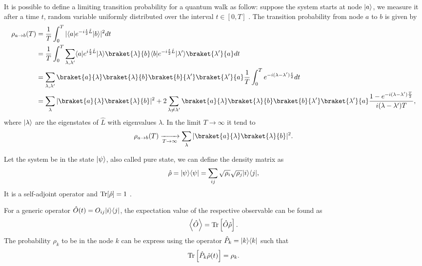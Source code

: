 It is possible to define a limiting transition probability for a quantum walk as follow: suppose the system starts at node $\lvert a\rangle$, we measure it after a time $t$, random variable uniformly distributed over the interval $t \in [0,T]$ \cite{quantum_walk}. The transition probability from node $a$ to $b$ is given by
\begin{equation}
    \begin{split}
        \rho_{a\rightarrow b}(T) &= \frac{1}{T}\int_0^T |\bra{a}e^{-i\frac{t}{2}\hat L} \ket{b}|^2 dt\\
        &=\frac{1}{T}\int_0^T \sum_{\lambda,\lambda'}\bra{a}e^{i\frac{t}{2}\hat L}\ket{\lambda}\braket{\lambda}{b} \bra{b}e^{-i\frac{t}{2}\hat L} \ket{\lambda'}\braket{\lambda'}{a} dt\\
        &= \sum_{\lambda,\lambda'}\braket{a}{\lambda}\braket{\lambda}{b}\braket{b}{\lambda'}\braket{\lambda'}{a}\frac{1}{T}\int_0^T e^{-i(\lambda-\lambda')\frac{t}{2}}dt\\
        &= \sum_\lambda|\braket{a}{\lambda}\braket{\lambda}{b}|^2+2\sum_{\lambda\neq\lambda'}\braket{a}{\lambda}\braket{\lambda}{b}\braket{b}{\lambda'}\braket{\lambda'}{a}\frac{1-e^{-i(\lambda-\lambda')\frac{T}{2}}}{i(\lambda-\lambda')T},\\
    \end{split}
\end{equation}
where $\lvert\lambda\rangle$ are the eigenstates of $\hat L$ with eigenvalues $\lambda$. In the limit $T\rightarrow \infty$ it tend to 
\begin{equation}
    \rho_{a\rightarrow b}(T) \xrightarrow[T \rightarrow \infty]{} \sum_\lambda|\braket{a}{\lambda}\braket{\lambda}{b}|^2.
\end{equation}

Let the system be in the state $\lvert\psi\rangle$, also called pure state, we can define the density matrix as
\begin{equation}
    \hat\rho =\lvert\psi\rangle\langle\psi\rvert = \sum_{ij} \sqrt{\rho_i} \sqrt{\rho_j}\lvert i\rangle\langle j\rvert,
\end{equation}
It is a self-adjoint operator and $\operatorname{Tr}[\hat\rho] = 1$ \cite{Nielsen_Chuang_2010}.

For a generic operator $\hat O(t) = O_{ij}\lvert i\rangle\langle j\rvert$, the expectation value of the respective observable can be found as
\begin{equation}
        \left< \hat O\right> = \operatorname{Tr}\left[\hat O\hat\rho\right].
\end{equation}
The probability $\rho_k$ to be in the node $k$ can be express using the operator $\hat P_k = \lvert k\rangle\langle k\rvert$ such that
\begin{equation} \label{state_projection_quantum}
    \begin{split}
        \operatorname{Tr}\left[\hat P_k\hat\rho(t)\right] 
        = \rho_k.
    \end{split}
\end{equation}

